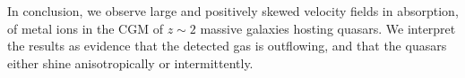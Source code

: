 \documentclass[iop]{emulateapj}
\begin{document}
In conclusion, we observe large and positively skewed velocity fields in absorption, of metal ions 
in the CGM of $z\sim2$ massive galaxies hosting quasars. We interpret the results as evidence that 
the detected gas is outflowing, and that the quasars either shine anisotropically or 
intermittently. 



%
%




\end{document}
